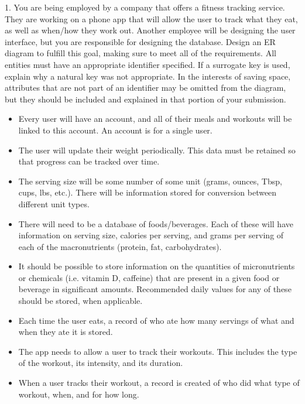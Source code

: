 \documentclass{report}
\begin{document}
    \begin{mdframed}
        1. You are being employed by a company that offers a fitness tracking service. They are working on a phone app that will allow the user to track what they
        eat, as well as when/how they work out. Another employee will be designing the user interface, but you are responsible for designing the database. Design
        an ER diagram to fulfill this goal, making sure to meet all of the requirements. All entities must have an appropriate identifier specified. If a surrogate key
        is used, explain why a natural key was not appropriate. In the interests of saving space, attributes that are not part of an identifier may be omitted from the
        diagram, but they should be included and explained in that portion of your submission. 
        \begin{itemize}
            \item Every user will have an account, and all of their meals and workouts will be linked to this account. An account is for a single user.
            \item The user will update their weight periodically. This data must be retained so that progress can be tracked over time.
            \item The serving size will be some number of some unit (grams, ounces, Tbsp, cups, lbs, etc.). There will be information stored for conversion between different unit types.
            \item There will need to be a database of foods/beverages. Each of these will have information on serving size, calories per serving, and grams per serving of each of the macronutrients (protein, fat, carbohydrates).
            \item It should be possible to store information on the quantities of micronutrients or chemicals (i.e. vitamin D, caffeine) that are present in a given food or beverage in significant amounts. Recommended daily values for any of these should be stored, when applicable.
            \item Each time the user eats, a record of who ate how many servings of what and when they ate it is stored.
            \item The app needs to allow a user to track their workouts. This includes the type of the workout, its intensity, and its duration.
            \item When a user tracks their workout, a record is created of who did what type of workout, when, and for how long.
        \end{itemize}
    \end{mdframed}
    \bigbreak \noindent 
    \bigbreak \noindent 
    \begin{figure}[]
        \centering
        \label{fig:1}
    \end{figure}
\end{document}
